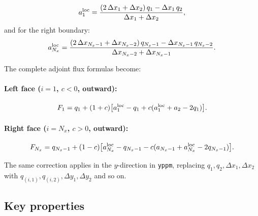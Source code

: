 \documentclass[11pt]{article}
\begin{document}
\begin{equation}
  a_1^{\rm loc} = \frac{(2\,\Delta x_1 + \Delta x_2)\,q_1 - \Delta x_1\,q_2}
                       {\Delta x_1 + \Delta x_2},
  \label{eq:al_loc_correct_left}
\end{equation}
and for the right boundary:
\begin{equation}
  a_{N_x}^{\rm loc} = \frac{(2\,\Delta x_{N_x-1} + \Delta x_{N_x-2})\,q_{N_x-1}
                       - \Delta x_{N_x-1}\,q_{N_x-2}}
                      {\Delta x_{N_x-2} + \Delta x_{N_x-1}}.
  \label{eq:al_loc_correct_right}
\end{equation}

The complete adjoint flux formulas become:

\paragraph{Left face ($i=1$, $c < 0$, outward):}
\begin{equation}
  F_1 = q_1 + (1+c)\bigl[a_1^{\rm loc} - q_1 + c(a_1^{\rm loc} + a_2 - 2q_1)\bigr].
  \label{eq:fix3_correct_left}
\end{equation}

\paragraph{Right face ($i=N_x$, $c > 0$, outward):}
\begin{equation}
  F_{N_x} = q_{N_x-1} + (1-c)\bigl[a_{N_x}^{\rm loc} - q_{N_x-1}
    - c(a_{N_x-1} + a_{N_x}^{\rm loc} - 2q_{N_x-1})\bigr].
  \label{eq:fix3_correct_right}
\end{equation}

The same correction applies in the $y$-direction in \texttt{yppm}, replacing
$q_1, q_2, \Delta x_1, \Delta x_2$ with $q_{(i,1)}, q_{(i,2)},
\Delta y_1, \Delta y_2$ and so on.

\subsection{Key properties}
\end{document}
